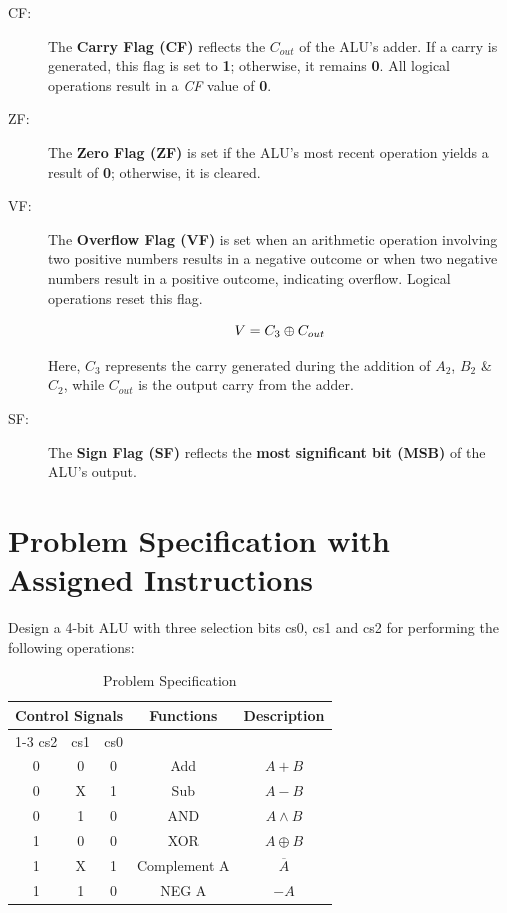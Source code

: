 \documentclass[12pt]{article}
\begin{document}
\begin{description} \item[CF:] The \textbf{Carry Flag (CF)} reflects the \textit{$C_{out}$} of the ALU's adder. If a carry is generated, this flag is set to \textbf{1}; otherwise, it remains \textbf{0}. All logical operations result in a \textit{CF} value of \textbf{0}.

\item[ZF:] The \textbf{Zero Flag (ZF)} is set if the ALU's most recent operation yields a result of \textbf{0}; otherwise, it is cleared.

\item[VF:] The \textbf{Overflow Flag (VF)} is set when an arithmetic operation involving two positive numbers results in a negative outcome or when two negative numbers result in a positive outcome, indicating overflow. Logical operations reset this flag.\


\begin{equation}
    V = C_3 \oplus C_{out}\\
\end{equation}

Here, \textit{$C_3$} represents the carry generated during the addition of $A_2$, $B_2$ \& $C_2$, while \textit{$C_{out}$} is the output carry from the adder.

\item[SF:] The \textbf{Sign Flag (SF)} reflects the \textbf{most significant bit (MSB)} of the ALU's output. \end{description}


\newpage
\section{\large{Problem Specification with Assigned Instructions}}
Design a 4-bit ALU with three selection bits cs0, cs1 and cs2 for performing the following operations:
\begin{table}[H]
    \centering
    \begin{tabular}{||c|c|c|c|c||}
    \hline
         \multicolumn{3}{||c|}{Control Signals} & \multirow{2}{*}{Functions} & \multirow{2}{*}{Description}\\
         \cline{1-3}
         cs2 & cs1 & cs0 & & \\
         \hline
         \hline
         0 & 0 & 0 & Add & $A + B$ \\
         0 & X & 1 & Sub & $A - B$ \\
         0 & 1 & 0 & AND & $A \land B$\\
         1 & 0 & 0 & XOR & $A \oplus B$\\
         1 & X & 1 & Complement A & $\overline{A}$\\
         1 & 1 & 0 & NEG A & $-A$\\
         \hline
    \end{tabular}
    \caption{Problem Specification}
    \label{tab:Table1}
\end{table}
\vspace{15mm}
\end{document}
